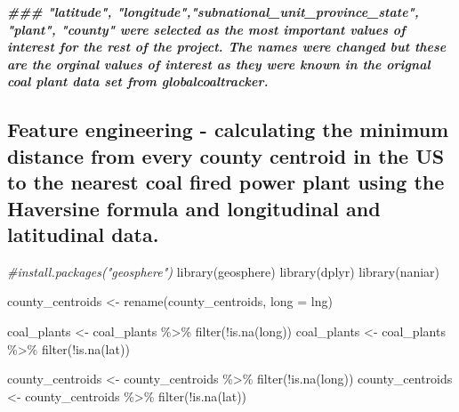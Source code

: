 \documentclass[
]{article}
\newenvironment{Shaded}{\begin{snugshade}}{\end{snugshade}}
\newcommand{\AttributeTok}[1]{\textcolor[rgb]{0.77,0.63,0.00}{#1}}
\newcommand{\CommentTok}[1]{\textcolor[rgb]{0.56,0.35,0.01}{\textit{#1}}}
\newcommand{\DocumentationTok}[1]{\textcolor[rgb]{0.56,0.35,0.01}{\textbf{\textit{#1}}}}
\newcommand{\FunctionTok}[1]{\textcolor[rgb]{0.00,0.00,0.00}{#1}}
\newcommand{\NormalTok}[1]{#1}
\newcommand{\OtherTok}[1]{\textcolor[rgb]{0.56,0.35,0.01}{#1}}
\newcommand{\SpecialCharTok}[1]{\textcolor[rgb]{0.00,0.00,0.00}{#1}}
\begin{document}
\begin{Shaded}
\begin{Highlighting}[]
\DocumentationTok{\#\#\# "latitude", "longitude","subnational\_unit\_province\_state", "plant", "county" were selected as the most important values of interest for the rest of the project. The names were changed but these are the orginal values of interest as they were known in the orignal coal plant data set from globalcoaltracker. }
\end{Highlighting}
\end{Shaded}

\hypertarget{feature-engineering---calculating-the-minimum-distance-from-every-county-centroid-in-the-us-to-the-nearest-coal-fired-power-plant-using-the-haversine-formula-and-longitudinal-and-latitudinal-data.}{%
\subsection{Feature engineering - calculating the minimum distance from
every county centroid in the US to the nearest coal fired power plant
using the Haversine formula and longitudinal and latitudinal
data.}\label{feature-engineering---calculating-the-minimum-distance-from-every-county-centroid-in-the-us-to-the-nearest-coal-fired-power-plant-using-the-haversine-formula-and-longitudinal-and-latitudinal-data.}}

\begin{Shaded}
\begin{Highlighting}[]
\CommentTok{\#install.packages("geosphere")}
\FunctionTok{library}\NormalTok{(geosphere)}
\FunctionTok{library}\NormalTok{(dplyr)}
\FunctionTok{library}\NormalTok{(naniar)}

\NormalTok{county\_centroids }\OtherTok{\textless{}{-}} \FunctionTok{rename}\NormalTok{(county\_centroids, }\AttributeTok{long =}\NormalTok{ lng)}

\NormalTok{coal\_plants }\OtherTok{\textless{}{-}}\NormalTok{ coal\_plants }\SpecialCharTok{\%\textgreater{}\%} 
  \FunctionTok{filter}\NormalTok{(}\SpecialCharTok{!}\FunctionTok{is.na}\NormalTok{(long))}
\NormalTok{coal\_plants }\OtherTok{\textless{}{-}}\NormalTok{ coal\_plants }\SpecialCharTok{\%\textgreater{}\%} 
  \FunctionTok{filter}\NormalTok{(}\SpecialCharTok{!}\FunctionTok{is.na}\NormalTok{(lat))}

\NormalTok{county\_centroids }\OtherTok{\textless{}{-}}\NormalTok{ county\_centroids }\SpecialCharTok{\%\textgreater{}\%} 
  \FunctionTok{filter}\NormalTok{(}\SpecialCharTok{!}\FunctionTok{is.na}\NormalTok{(long))}
\NormalTok{county\_centroids }\OtherTok{\textless{}{-}}\NormalTok{ county\_centroids }\SpecialCharTok{\%\textgreater{}\%} 
  \FunctionTok{filter}\NormalTok{(}\SpecialCharTok{!}\FunctionTok{is.na}\NormalTok{(lat))}
\end{Highlighting}
\end{Shaded}
\end{document}
